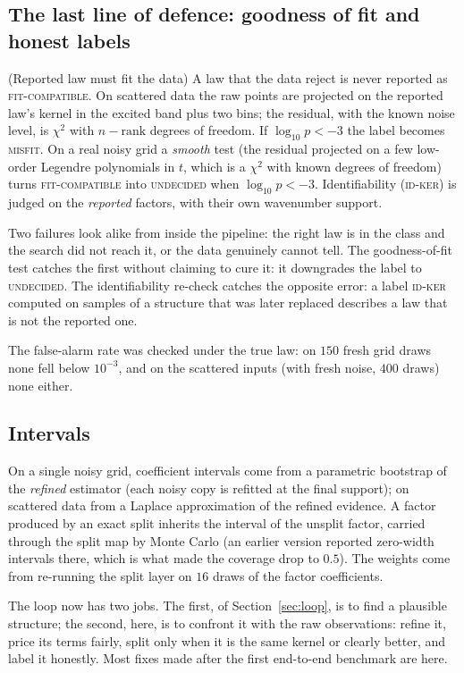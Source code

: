 \subsection{The last line of defence: goodness of fit and honest labels}
\begin{theorem}{(Reported law must fit the data)  \impl}\label{thm:gof}
A law that the data reject is never reported as \textsc{fit-compatible}. On scattered data the raw points are projected on the reported law's kernel in the excited band plus two bins; the residual, with the known noise level, is $\chi^2$ with $n-\mathrm{rank}$ degrees of freedom. If $\log_{10}p<-3$ the label becomes \textsc{misfit}. On a real noisy grid a \emph{smooth} test (the residual projected on a few low-order Legendre polynomials in $t$, which is a $\chi^2$ with known degrees of freedom) turns \textsc{fit-compatible} into \textsc{undecided} when $\log_{10}p<-3$. Identifiability (\textsc{id-ker}) is judged on the \emph{reported} factors, with their own wavenumber support.
\end{theorem}
\begin{intuition}
Two failures look alike from inside the pipeline: the right law is in the class and the search did not reach it, or the data genuinely cannot tell. The goodness-of-fit test catches the first without claiming to cure it: it downgrades the label to \textsc{undecided}. The identifiability re-check catches the opposite error: a label \textsc{id-ker} computed on samples of a structure that was later replaced describes a law that is not the reported one.
\end{intuition}
The false-alarm rate was checked under the true law: on $150$ fresh grid draws none fell below $10^{-3}$, and on the scattered inputs (with fresh noise, $400$ draws) none either.

\subsection{Intervals}
On a single noisy grid, coefficient intervals come from a parametric bootstrap of the \emph{refined} estimator (each noisy copy is refitted at the final support); on scattered data from a Laplace approximation of the refined evidence. A factor produced by an exact split inherits the interval of the unsplit factor, carried through the split map by Monte Carlo (an earlier version reported zero-width intervals there, which is what made the coverage drop to $0.5$). The weights come from re-running the split layer on $16$ draws of the factor coefficients.

\begin{takeaway}
The loop now has two jobs. The first, of Section~\ref{sec:loop}, is to find a plausible structure; the second, here, is to confront it with the raw observations: refine it, price its terms fairly, split only when it is the same kernel or clearly better, and label it honestly. Most fixes made after the first end-to-end benchmark are here.
\end{takeaway}
